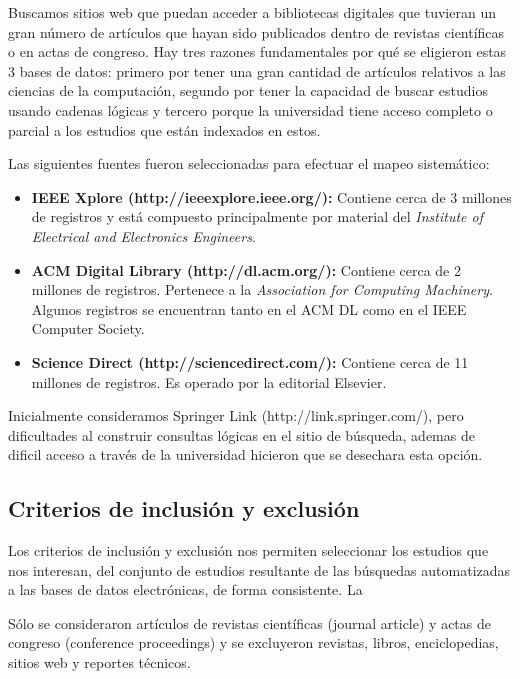Buscamos sitios web que puedan acceder a bibliotecas digitales que tuvieran un gran número 
de artículos que hayan sido publicados dentro de revistas científicas o en actas de congreso.
Hay tres razones fundamentales por qué se eligieron estas 3 bases de datos: primero por 
tener una gran cantidad de artículos relativos a las ciencias de la computación, segundo por
tener la capacidad de buscar estudios usando cadenas lógicas y tercero porque la universidad
tiene acceso completo o parcial a los estudios que están indexados en estos.

Las siguientes fuentes fueron seleccionadas para efectuar el mapeo sistemático:

\begin{itemize}
	\item \textbf{IEEE Xplore (http://ieeexplore.ieee.org/):} Contiene cerca de 3 millones de registros
	y está compuesto principalmente por material del \textit{Institute of Electrical and Electronics Engineers}.
	
	\item \textbf{ACM Digital Library (http://dl.acm.org/):} Contiene cerca de 2 millones de registros. Pertenece
		a la \textit{Association for Computing Machinery}. Algunos registros se encuentran tanto en el ACM DL 
		como en el IEEE Computer Society.
		
	\item \textbf{Science Direct (http://sciencedirect.com/):} Contiene cerca de 11 millones de registros. Es operado 
		por la editorial Elsevier.
\end{itemize}

Inicialmente consideramos Springer Link (http://link.springer.com/), pero dificultades
al construir consultas lógicas en el sitio de búsqueda, ademas de dificil acceso a través de la universidad 
hicieron que se desechara esta opción.


\newpage
\subsection{Criterios de inclusión y exclusión}

Los criterios de inclusión y exclusión nos permiten seleccionar los estudios
que nos interesan, del conjunto de estudios resultante de las búsquedas 
automatizadas a las bases de datos electrónicas, de forma consistente. La 

Sólo se consideraron artículos de revistas científicas (journal article) y 
actas de congreso (conference proceedings) y se excluyeron
revistas, libros, enciclopedias, sitios web y reportes técnicos.

